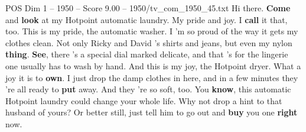 \begin{textsample}{POS Dim 1 – 1950 – Score 9.00 – 1950/tv\_com\_1950\_45.txt}  \label{ex:f1_pos_014}
Hi there. \textbf{Come} and \textbf{look} at my Hotpoint automatic laundry.
My pride and joy.
I \textbf{call} it that, too.
This is my pride, the automatic washer.
I 'm so proud of the way it gets my clothes clean.
Not only Ricky and David 's shirts and jeans, but even my nylon \textbf{thing}. \textbf{See}, there 's a special dial marked delicate, and that 's for the lingerie one usually has to wash by hand.
And this is my joy, the Hotpoint dryer.
What a joy it is to \textbf{own}.
I just drop the damp clothes in here, and in a few minutes they 're all ready to \textbf{put} away.
And they 're so soft, too.
You \textbf{know}, this automatic Hotpoint laundry could change your whole life.
Why not drop a hint to that husband of yours?
Or better still, just tell him to go out and \textbf{buy} you one \textbf{right} now.

\end{textsample}
